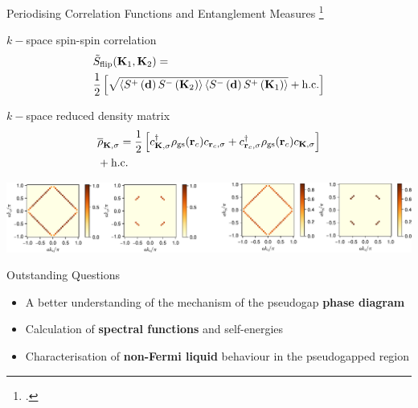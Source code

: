 \documentclass[11pt,aspectratio=169]{beamer}
\newcommand\focus[1]{%
	{\alert{\textbf{#1}}}
}
\begin{document}
\begin{frame}{Periodising Correlation Functions and Entanglement Measures}
	\footcite{Rozenberg2022,Meixner2024}
	\begin{minipage}{0.49\textwidth}
	\(k-\)space spin-spin correlation
	\begin{equation*}\begin{aligned}
	&\tilde{S}_\text{flip}({\bf K}_1, {\bf K}_2) = \\
	&\frac{1}{2}\left[\sqrt{\braket{S^+\left({\bf d}\right)S^-\left({\bf K}_2\right)}\braket{S^-\left({\bf d}\right)S^+\left({\bf K}_1\right)}} + \text{h.c.}\right]
	\end{aligned}\end{equation*}
	\end{minipage}
	\begin{minipage}{0.49\textwidth}
	\(k-\)space reduced density matrix
	\begin{equation*}\begin{aligned}
		&\overline\rho_{{\bf K},\sigma} = \frac{1}{2}\left[c^\dagger_{{\bf K},\sigma} \rho_\text{gs}({\bf r}_c) c_{{\bf r}_c,\sigma} + c^\dagger_{{\bf r}_c,\sigma} \rho_\text{gs}({\bf r}_c) c_{{\bf K},\sigma}\right] \\
		& + \text{h.c.}
	\end{aligned}\end{equation*}
	\end{minipage}
	
	\vspace{\fill}
	\centering
	\includegraphics[width=\textwidth]{tilingEnt.pdf}
\end{frame}

\begin{frame}{Outstanding Questions}
	\begin{itemize}
		\item A better understanding of the mechanism of the pseudogap \focus{phase diagram}\\[10pt]
		\item Calculation of \focus{spectral functions} and self-energies\\[10pt]
		\item Characterisation of \focus{non-Fermi liquid} behaviour in the pseudogapped region
	\end{itemize}
\end{frame}
\end{document}
